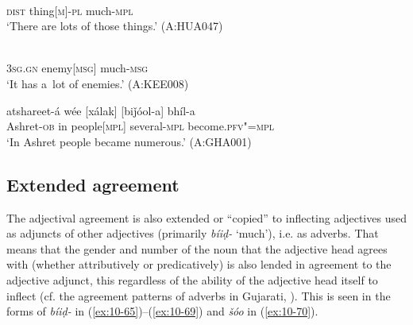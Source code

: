 \begin{exe}
\ex
\label{ex:10-62}
 \\
\textsc{dist} thing[\textsc{m}]-\textsc{pl} much-\textsc{mpl} \\
\glt `There are lots of those things.' (A:HUA047)

\ex
\label{ex:10-63}
 \\
\textsc{3sg.gn} enemy[\textsc{msg}] much-\textsc{msg} \\
\glt `It has a~lot of enemies.' (A:KEE008)

\ex
\label{ex:10-64}
\gll atshareet-á wée [xálak] [biǰóol-a] bhíl-a \\
Ashret-\textsc{ob} in people[\textsc{mpl}] several-\textsc{mpl} become.\textsc{pfv"=mpl} \\
\glt `In Ashret people became numerous.' (A:GHA001)
\end{exe}

\subsection{Extended agreement}
\label{subsec:10-3-4}


The adjectival agreement is also extended or ``copied'' to inflecting adjectives used as adjuncts of other adjectives (primarily \textit{bíiḍ-} `much'), i.e. as adverbs. That means that the gender and number of the noun that the adjective head agrees with (whether attributively or predicatively) is also lended in agreement to the adjective adjunct, this regardless of the ability of the adjective head itself to inflect (cf. the agreement patterns of adverbs in Gujarati, \citealt{hookjoshi1991}). This is seen in the forms of \textit{bíiḍ-} in (\ref{ex:10-65})--(\ref{ex:10-69}) and \textit{šóo} in (\ref{ex:10-70}).

